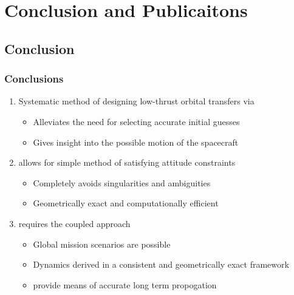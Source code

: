 

\section[Conclusion]{Conclusion and Publicaitons}
\subsection*{Conclusion}

\begin{frame} %
\frametitle{Conclusions}
  \begin{enumerate}
    \item<1-> Systematic method of designing low-thrust orbital transfers via 
    \begin{itemize}
        \item Alleviates the need for selecting accurate initial guesses 
        \item Gives insight into the possible motion of the spacecraft
    \end{itemize}
    \item<2->  allows for simple method of satisfying attitude constraints
    \begin{itemize}
        \item Completely avoids singularities and ambiguities
        \item Geometrically exact and computationally efficient
    \end{itemize}
    \item<3->  requires the coupled approach 
    \begin{itemize}
        \item Global mission scenarios are possible
        \item Dynamics derived in a consistent and geometrically exact framework
        \item {} provide means of accurate long term propogation
    \end{itemize}

  \end{enumerate}
\end{frame}   %


